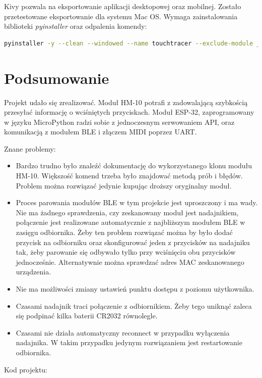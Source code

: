 \documentclass[eng,printmode]{mgr}
\begin{document}
Kivy pozwala na eksportowanie aplikacji desktopowej oraz mobilnej. Zostało przetestowane eksportowanie dla systemu Mac OS. Wymaga zainstalowania biblioteki \textit{pyinstaller} oraz odpalenia komendy:
\begin{lstlisting}[language=bash, breaklines = true]
pyinstaller -y --clean --windowed --name touchtracer --exclude-module _tkinter --exclude-module Tkinter --exclude-module enchant --exclude-module twisted main.py
\end{lstlisting}

\section{Podsumowanie}

Projekt udało się zrealizować. Moduł HM-10 potrafi z zadowalającą szybkością przesyłać informację o wciśniętych przyciskach. Moduł ESP-32, zaprogramowany w języku MicroPython radzi sobie z jednoczesnym serwowaniem API, oraz komunikacją z modułem BLE i złączem MIDI poprzez UART.

Znane problemy:

\begin{itemize}
\item Bardzo trudno było znaleźć dokumentację do wykorzystanego klonu modułu HM-10. Większość komend trzeba było znajdować metodą prób i błędów. Problem można rozwiązać jedynie kupując droższy oryginalny moduł.
\item Proces parowania modułów BLE w tym projekcie jest uproszczony i ma wady. Nie ma żadnego sprawdzenia, czy zeskanowany moduł jest nadajnikiem, połączenie jest realizowane automatycznie z najbliższym modułem BLE w zasięgu odbiornika. Żeby ten problem rozwiązać można by było dodać przycisk na odbiorniku oraz skonfigurować jeden z przycisków na nadajniku tak, żeby parowanie się odbywało tylko przy wciśnięciu obu przycisków jednocześnie. Alternatywnie można sprawdzać adres MAC zeskanowanego urządzenia.
\item Nie ma możliwości zmiany ustawień punktu dostępu z poziomu użytkownika.
\item Czasami nadajnik traci połączenie z odbiornikiem. Żeby tego uniknąć zaleca się podpinać kilka baterii CR2032 równolegle.
\item Czasami nie działa automatyczny reconnect w przypadku wyłączenia nadajnika. W takim przypadku jedynym rozwiązaniem jest restartowanie odbiornika.
\end{itemize}

Kod projektu:
\end{document}
